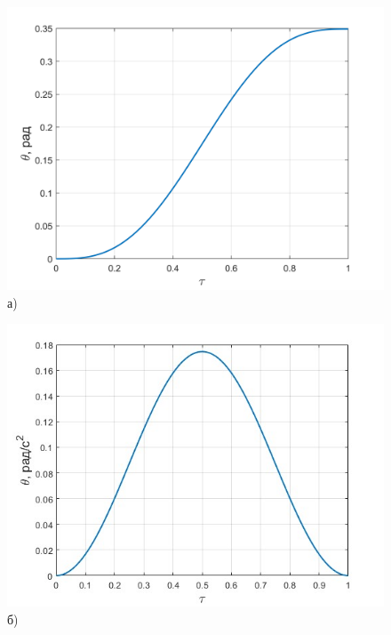 \begin{figure}[h!]
	\begin{minipage}[b]{0.49\linewidth}\centering
		\includegraphics[width=\linewidth]{matlab/img/theta_sin} \\а)  
	\end{minipage}
	\hfill
	\begin{minipage}[b]{0.49\linewidth}\centering
		\includegraphics[width=\linewidth]{matlab/img/omega_sin.jpg} \\б)  
	\end{minipage}
	
	\vspace{0.5em} %
	

\end{figure}
